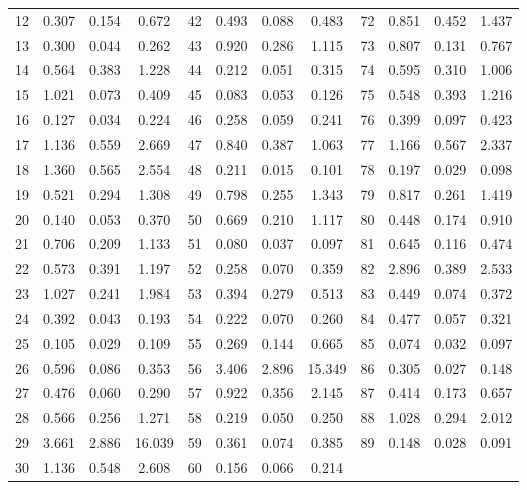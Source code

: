 \begin{table}[htbp]
\begin{tabular}{cccc @{\hspace{2em}} cccc @{\hspace{2em}} cccc}
        12 & 0.307 & 0.154 & 0.672 & 42 & 0.493 & 0.088 & 0.483 & 72 & 0.851 & 0.452 & 1.437 \\
        13 & 0.300 & 0.044 & 0.262 & 43 & 0.920 & 0.286 & 1.115 & 73 & 0.807 & 0.131 & 0.767 \\
        14 & 0.564 & 0.383 & 1.228 & 44 & 0.212 & 0.051 & 0.315 & 74 & 0.595 & 0.310 & 1.006 \\
        15 & 1.021 & 0.073 & 0.409 & 45 & 0.083 & 0.053 & 0.126 & 75 & 0.548 & 0.393 & 1.216 \\
        16 & 0.127 & 0.034 & 0.224 & 46 & 0.258 & 0.059 & 0.241 & 76 & 0.399 & 0.097 & 0.423 \\
        17 & 1.136 & 0.559 & 2.669 & 47 & 0.840 & 0.387 & 1.063 & 77 & 1.166 & 0.567 & 2.337 \\
        18 & 1.360 & 0.565 & 2.554 & 48 & 0.211 & 0.015 & 0.101 & 78 & 0.197 & 0.029 & 0.098 \\
        19 & 0.521 & 0.294 & 1.308 & 49 & 0.798 & 0.255 & 1.343 & 79 & 0.817 & 0.261 & 1.419 \\
        20 & 0.140 & 0.053 & 0.370 & 50 & 0.669 & 0.210 & 1.117 & 80 & 0.448 & 0.174 & 0.910 \\
        21 & 0.706 & 0.209 & 1.133 & 51 & 0.080 & 0.037 & 0.097 & 81 & 0.645 & 0.116 & 0.474 \\
        22 & 0.573 & 0.391 & 1.197 & 52 & 0.258 & 0.070 & 0.359 & 82 & 2.896 & 0.389 & 2.533 \\
        23 & 1.027 & 0.241 & 1.984 & 53 & 0.394 & 0.279 & 0.513 & 83 & 0.449 & 0.074 & 0.372 \\
        24 & 0.392 & 0.043 & 0.193 & 54 & 0.222 & 0.070 & 0.260 & 84 & 0.477 & 0.057 & 0.321 \\
        25 & 0.105 & 0.029 & 0.109 & 55 & 0.269 & 0.144 & 0.665 & 85 & 0.074 & 0.032 & 0.097 \\
        26 & 0.596 & 0.086 & 0.353 & 56 & 3.406 & 2.896 & 15.349 & 86 & 0.305 & 0.027 & 0.148 \\
        27 & 0.476 & 0.060 & 0.290 & 57 & 0.922 & 0.356 & 2.145 & 87 & 0.414 & 0.173 & 0.657 \\
        28 & 0.566 & 0.256 & 1.271 & 58 & 0.219 & 0.050 & 0.250 & 88 & 1.028 & 0.294 & 2.012 \\
        29 & 3.661 & 2.886 & 16.039 & 59 & 0.361 & 0.074 & 0.385 & 89 & 0.148 & 0.028 & 0.091 \\
        30 & 1.136 & 0.548 & 2.608 & 60 & 0.156 & 0.066 & 0.214 &  & & &  \\
        \bottomrule
    \end{tabular}
\end{table}

